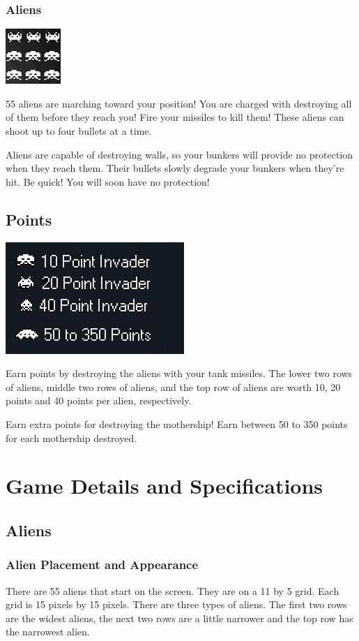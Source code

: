 \documentclass[11pt,letter,oneside]{report}
\begin{document}
\subsubsection{Aliens}
\includegraphics[]{aliens.jpg}

55 aliens are marching toward your position! You are charged with destroying all of them before they reach you! Fire your missiles to kill them! These aliens can shoot up to four bullets at a time. 

Aliens are capable of destroying walls, so your bunkers will provide no protection when they reach them. Their bullets slowly degrade your bunkers when they're hit. Be quick! You will soon have no protection!

\subsection{Points}
\includegraphics[]{scoring.jpg}

Earn points by destroying the aliens with your tank missiles. The lower two rows of aliens, middle two rows of aliens, and the top row of aliens are worth 10, 20 points and 40 points per alien, respectively.

Earn extra points for destroying the mothership! Earn between 50 to 350 points for each mothership destroyed.

\section{Game Details and Specifications}

\subsection{Aliens}

\subsubsection{Alien Placement and Appearance}
There are 55 aliens that start on the screen.  They are on a 11 by 5 grid.  Each grid is 15 pixels by 15 pixels.  There are three types of aliens.  The first two rows are the widest aliens, the next two rows are a little narrower and the top row has the narrowest alien.
\end{document}
